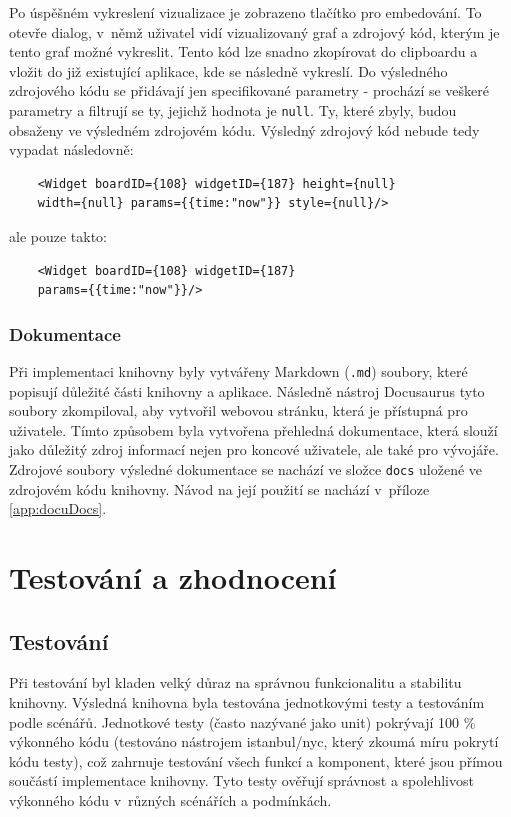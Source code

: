 \documentclass[czech, bc, kiv, he, iso690numb, viewonly]{fasthesis} %
\begin{document}
Po úspěšném vykreslení vizualizace je zobrazeno tlačítko pro embedování. To otevře dialog, v~němž uživatel vidí vizualizovaný graf a zdrojový kód, kterým je tento graf možné vykreslit.
Tento kód lze snadno zkopírovat do clipboardu a vložit do již existující aplikace, kde se následně vykreslí. Do výsledného zdrojového kódu se přidávají jen specifikované parametry -
prochází se veškeré parametry a filtrují se ty, jejichž hodnota je \texttt{null}. Ty, které zbyly, budou obsaženy ve výsledném zdrojovém kódu. Výsledný zdrojový kód nebude tedy vypadat následovně:
\begin{lstlisting}
	<Widget boardID={108} widgetID={187} height={null}
	width={null} params={{time:"now"}} style={null}/>
\end{lstlisting}
ale pouze takto:
\begin{lstlisting}
	<Widget boardID={108} widgetID={187} 
	params={{time:"now"}}/>
\end{lstlisting}

\subsection{Dokumentace}

Při implementaci knihovny byly vytvářeny Markdown (\texttt{.md}) soubory, které popisují důležité části knihovny a aplikace. Následně nástroj Docusaurus tyto soubory zkompiloval,
aby vytvořil webovou stránku, která je přístupná pro uživatele. Tímto způsobem byla vytvořena přehledná dokumentace, která slouží jako důležitý zdroj informací nejen pro koncové uživatele,
ale také pro vývojáře. Zdrojové soubory výsledné dokumentace se nachází ve složce \texttt{docs} uložené ve zdrojovém kódu knihovny. Návod na její použití se nachází v~příloze \ref{app:docuDocs}.

\chapter{Testování a zhodnocení}
\section{Testování}
\label{sect:testovani}
Při testování byl kladen velký důraz na správnou funkcionalitu a stabilitu knihovny. Výsledná knihovna byla testována jednotkovými testy a testováním podle
scénářů. Jednotkové testy (často nazývané jako unit) pokrývají 100 \% výkonného kódu (testováno nástrojem istanbul/nyc, který zkoumá míru pokrytí kódu testy), což zahrnuje testování všech funkcí a komponent, 
které jsou přímou součástí implementace knihovny.
Tyto testy ověřují správnost a spolehlivost výkonného kódu v~různých scénářích a podmínkách.
\end{document}
